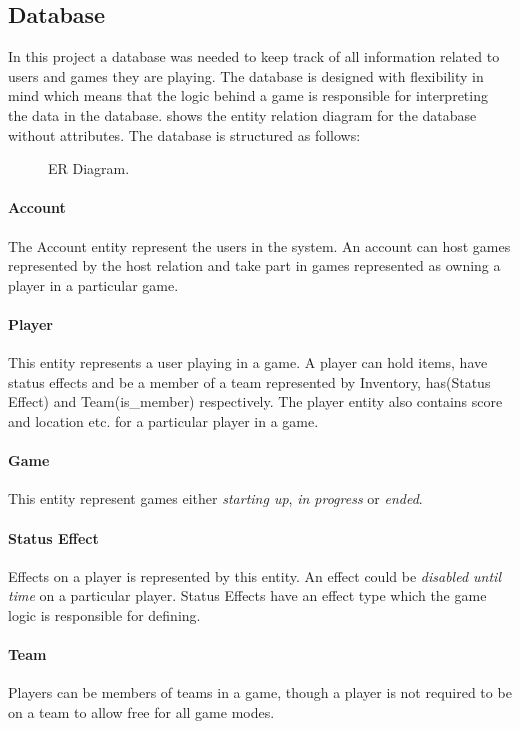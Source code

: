 \subsection{Database}\label{subsec:databasedesign}
In this project a database was needed to keep track of all information related to users and games they are playing. The database is designed with flexibility in mind which means that the logic behind a game is responsible for interpreting the data in the database.  shows the entity relation diagram for the database without attributes. The database is structured as follows:

\begin{figure}
  \centering
    
  \caption{ER Diagram.}
  \label{fig:ER}
\end{figure}

\paragraph{Account}
The Account entity represent the users in the system. An account can host games represented by the host relation and take part in games represented as owning a player in a particular game.

\paragraph{Player}
This entity represents a user playing in a game. A player can hold items, have status effects and be a member of a team represented by Inventory, has(Status Effect) and Team(is\_member) respectively. The player entity also contains score and location etc. for a particular player in a game.

\paragraph{Game}
This entity represent games either \textit{starting up}, \textit{in progress} or \textit{ended}.

\paragraph{Status Effect}
Effects on a player is represented by this entity. An effect could be \textit{disabled until time} on a particular player. Status Effects have an effect type which the game logic is responsible for defining.

\paragraph{Team}
Players can be members of teams in a game, though a player is not required to be on a team to allow free for all game modes.

